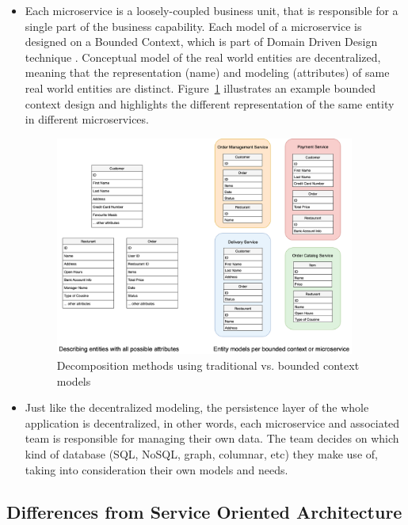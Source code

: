 \documentclass{Configuration_Files/PoliMi3i_thesis}
\begin{document}
\begin{itemize}
    \item Each microservice is a loosely-coupled business unit, that is responsible for a single part of the business capability.
    Each model of a microservice is designed on a Bounded Context, which is part of Domain Driven Design technique \cite{boundedcontext}. Conceptual model of the real world entities are decentralized, meaning that the representation (name) and modeling (attributes) of same real world entities are distinct. Figure~\ref{fig:context} illustrates an example bounded context design and highlights the different representation of the same entity in different microservices.
    
    \begin{figure}[H]
    \centering
    \includegraphics[width=0.93\textwidth]{myImages/context.png}
    \caption{Decomposition methods using traditional vs. bounded context models}
    \label{fig:context}
    \end{figure}

    \item Just like the decentralized modeling, the persistence layer of the whole application is decentralized, in other words, each microservice and associated team is responsible for managing their own data. The team decides on which kind of database (SQL, NoSQL, graph, columnar, etc) they make use of, taking into consideration their own models and needs.

\end{itemize}

\subsection{Differences from Service Oriented Architecture}
\label{subsec:diff}
\end{document}
